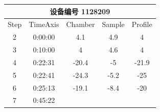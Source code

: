 \documentclass[UTF8,10pt,a4paper,fontset=fandol]{ctexart}
\newcommand{\fieldvalue}[1]{#1}
\begin{document}
\begin{center}
\begin{tabular}{|c|c|c|c|c|}
\hline
\multicolumn{5}{|c|}{设备编号\quad
\fieldvalue{1128209}}\\
\hline
Step & TimeAxis & Chamber & Sample & Profile\\
\hline
\fieldvalue{2} &
\fieldvalue{0:00:00} &
\fieldvalue{4.1} &
\fieldvalue{4.9} &
\fieldvalue{4}\\
\hline
\fieldvalue{3} &
\fieldvalue{0:10:00} &
\fieldvalue{4} &
\fieldvalue{4.6} &
\fieldvalue{4}\\
\hline
\fieldvalue{4} &
\fieldvalue{0:22:31} &
\fieldvalue{-20.4} &
\fieldvalue{-5} &
\fieldvalue{-21.9}\\
\hline
\fieldvalue{5} &
\fieldvalue{0:22:41} &
\fieldvalue{-24.3} &
\fieldvalue{-5.2} &
\fieldvalue{-25}\\
\hline
\fieldvalue{6} &
\fieldvalue{0:25:13} &
\fieldvalue{-19.1} &
\fieldvalue{-8.4} &
\fieldvalue{-20}\\
\hline
\fieldvalue{7} &
\fieldvalue{0:45:22} &

\end{tabular}
\end{center}
\end{document}
